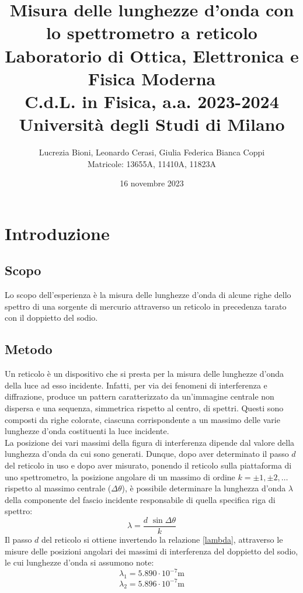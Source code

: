 \documentclass[]{article}
\title{%
    \Huge Misura delle lunghezze d'onda con lo spettrometro a reticolo \\
    \Large Laboratorio di Ottica, Elettronica e Fisica Moderna \\ C.d.L. in Fisica, a.a. 2023-2024 \\ Università degli Studi di Milano}
\author{\LARGE Lucrezia Bioni, Leonardo Cerasi, Giulia Federica Bianca Coppi \\ Matricole: 13655A, 11410A, 11823A}
\date{16 novembre 2023}
\let\oldsection\section%
\renewcommand{\section}{%
	\renewcommand{\theequation}{\thesection.\arabic{equation}}%
	\oldsection}%
\let\oldsubsection\subsection%
\renewcommand{\subsection}{%
	\renewcommand{\theequation}{\thesubsection.\arabic{equation}}%
	\oldsubsection}%
\begin{document}
    \maketitle

    \section{Introduzione}

    \subsection{Scopo}
    Lo scopo dell'esperienza è la misura delle lunghezze d'onda di alcune righe dello spettro di una sorgente di mercurio attraverso un reticolo in precedenza tarato con il doppietto del sodio.

    \subsection{Metodo}
    Un reticolo è un dispositivo che si presta per la misura delle lunghezze d'onda della luce ad esso incidente. Infatti, per via dei fenomeni di interferenza e diffrazione, produce un pattern caratterizzato da un'immagine centrale non dispersa e una sequenza, simmetrica rispetto al centro, di spettri. Questi sono composti da righe colorate, ciascuna corrispondente a un massimo delle varie lunghezze d'onda costituenti la luce incidente. \\
    La posizione dei vari massimi della figura di interferenza dipende dal valore della lunghezza d'onda da cui sono generati. Dunque, dopo aver determinato il passo $d$ del reticolo in uso e dopo aver misurato, ponendo il reticolo sulla piattaforma di uno spettrometro, la posizione angolare di un massimo di ordine $k=\pm 1, \pm 2,\ldots$ rispetto al massimo centrale ($\Delta \theta$), è possibile determinare la lunghezza d'onda $\lambda$ della componente del fascio incidente responsabile di quella specifica riga di spettro:
    \begin{equation}
        \label{lambda}
        \lambda = \frac{d \, \, \sin{\Delta\theta}}{k}
    \end{equation}
    Il passo $d$ del reticolo si ottiene invertendo la relazione \ref{lambda}, attraverso le misure delle posizioni angolari dei massimi di interferenza del doppietto del sodio, le cui lunghezze d'onda si assumono note:
    \begin{equation}
        \label{lambda-sodio-1}
        \lambda_1 = 5.890 \cdot 10^{-7} \text{m}
    \end{equation}
    \begin{equation}
        \label{lambda-sodio-2}
        \lambda_2 = 5.896 \cdot 10^{-7} \text{m}
    \end{equation}
\end{document}
